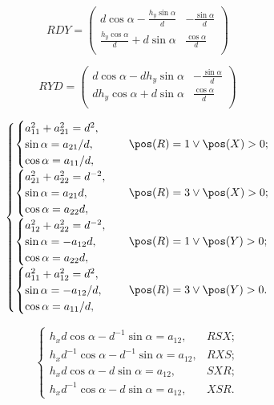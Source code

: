 $$RDY =
 \begin{pmatrix} d \cos\alpha -
 \displaystyle\frac{h_y \sin\alpha}{d} & - \displaystyle\frac{\sin\alpha}{d} \\
\displaystyle\frac{h_y \cos\alpha}{d} + d \sin\alpha & \displaystyle\frac{\cos\alpha}{d} \\
 \end{pmatrix} $$

$$RYD =
 \begin{pmatrix} d \cos\alpha -
 d h_y \sin\alpha & - \displaystyle\frac{\sin\alpha}{d} \\
d h_y \cos\alpha +
 d \sin\alpha & \displaystyle\frac{\cos\alpha}{d} \\
 \end{pmatrix} $$




$$
\begin{cases}
	\begin{cases}
		a_{11}^2 + a_{21}^2 = d^2, \\
		\sin\alpha = a_{21}/d,\\
		\cos\alpha = a_{11}/d,
	\end{cases} & \pos(R)=1 \vee \pos(X)>0;\\
	\begin{cases}
		a_{21}^2 + a_{22}^2 = d^{-2}, \\
		\sin\alpha = a_{21}d,\\
		\cos\alpha = a_{22}d,
	\end{cases} & \pos(R)=3 \vee \pos(X)>0;\\
	\begin{cases}
		a_{12}^2 + a_{22}^2 = d^{-2},\\
		\sin\alpha = -a_{12}d,\\
		\cos\alpha =  a_{22}d,
	\end{cases} & \pos(R)=1 \vee \pos(Y)>0;\\
	\begin{cases}
		a_{11}^2 + a_{12}^2 = d^2,\\
		\sin\alpha = -a_{12}/d,\\
		\cos\alpha =  a_{11}/d,
	\end{cases} & \pos(R)=3 \vee \pos(Y)>0.\\
\end{cases}
$$

$$\begin{cases}
	h_x  d\cos\alpha - d^{-1}\sin\alpha = a_{12}, & RSX;\\
	h_x d^{-1}\cos\alpha - d^{-1}\sin\alpha = a_{12}, & RXS;\\
	h_x d\cos\alpha - d\sin\alpha = a_{12}, & SXR;\\
	h_x d^{-1}\cos\alpha - d\sin\alpha = a_{12}, & XSR.
\end{cases}$$

